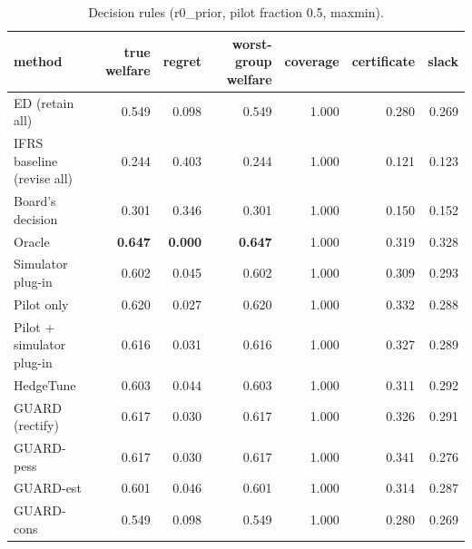 \begin{table}[t]
\centering
\small
\begin{tabular}{lrrrrrr}
\toprule
method & true welfare & regret & worst-group welfare & coverage & certificate & slack \\
\midrule
ED (retain all) & 0.549 & 0.098 & 0.549 & 1.000 & 0.280 & 0.269 \\
IFRS baseline (revise all) & 0.244 & 0.403 & 0.244 & 1.000 & 0.121 & 0.123 \\
Board's decision & 0.301 & 0.346 & 0.301 & 1.000 & 0.150 & 0.152 \\
Oracle & \textbf{0.647} & \textbf{0.000} & \textbf{0.647} & 1.000 & 0.319 & 0.328 \\
Simulator plug-in & 0.602 & 0.045 & 0.602 & 1.000 & 0.309 & 0.293 \\
Pilot only & 0.620 & 0.027 & 0.620 & 1.000 & 0.332 & 0.288 \\
Pilot + simulator plug-in & 0.616 & 0.031 & 0.616 & 1.000 & 0.327 & 0.289 \\
HedgeTune & 0.603 & 0.044 & 0.603 & 1.000 & 0.311 & 0.292 \\
GUARD (rectify) & 0.617 & 0.030 & 0.617 & 1.000 & 0.326 & 0.291 \\
GUARD-pess & 0.617 & 0.030 & 0.617 & 1.000 & 0.341 & 0.276 \\
GUARD-est & 0.601 & 0.046 & 0.601 & 1.000 & 0.314 & 0.287 \\
GUARD-cons & 0.549 & 0.098 & 0.549 & 1.000 & 0.280 & 0.269 \\
\bottomrule
\end{tabular}
\caption{Decision rules (r0\_prior, pilot fraction 0.5, maxmin).}
\label{tab:methods-maxmin}
\end{table}
